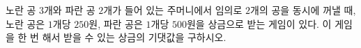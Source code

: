 노란 공 $3$개와 파란 공 $2$개가 들어 있는 주머니에서 임의로 $2$개의 공을 동시에 꺼낼 때, 노란 공은 $1$개당 $250$원, 파란 공은 $1$개당 $500$원을 상금으로 받는 게임이 있다. 이 게임을 한 번 해서 받을 수 있는 상금의 기댓값을 구하시오.
